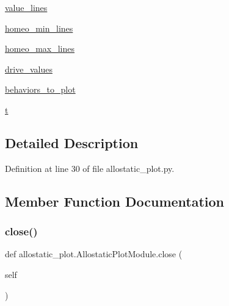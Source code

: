 \begin{DoxyCompactItemize}
\hyperlink{classallostatic__plot_1_1AllostaticPlotModule_a42413fcb78c3c2bb59f0de4f4646bfe1}{value\+\_\+lines}
\item 
\hyperlink{classallostatic__plot_1_1AllostaticPlotModule_ad6f8317d099025d53b670edc3d5e9862}{homeo\+\_\+min\+\_\+lines}
\item 
\hyperlink{classallostatic__plot_1_1AllostaticPlotModule_a1b05367024ac7c403294e7488b1595a4}{homeo\+\_\+max\+\_\+lines}
\item 
\hyperlink{classallostatic__plot_1_1AllostaticPlotModule_aae3bf1ed5bb83c50dda22beb0a2c1bed}{drive\+\_\+values}
\item 
\hyperlink{classallostatic__plot_1_1AllostaticPlotModule_a9555c741d615e20be765dc64579f010d}{behaviors\+\_\+to\+\_\+plot}
\item 
\hyperlink{classallostatic__plot_1_1AllostaticPlotModule_ae20ad9e6f886275492e34cded00f1046}{t}
\end{DoxyCompactItemize}


\subsection{Detailed Description}


Definition at line 30 of file allostatic\+\_\+plot.\+py.



\subsection{Member Function Documentation}
\mbox{\label{classallostatic__plot_1_1AllostaticPlotModule_a502d91cdd375d04bdcd1530e8eb283ea}} 
\subsubsection{\texorpdfstring{close()}{close()}}
{\footnotesize\ttfamily def allostatic\+\_\+plot.\+Allostatic\+Plot\+Module.\+close (\begin{DoxyParamCaption}\item[{}]{self }\end{DoxyParamCaption})}



